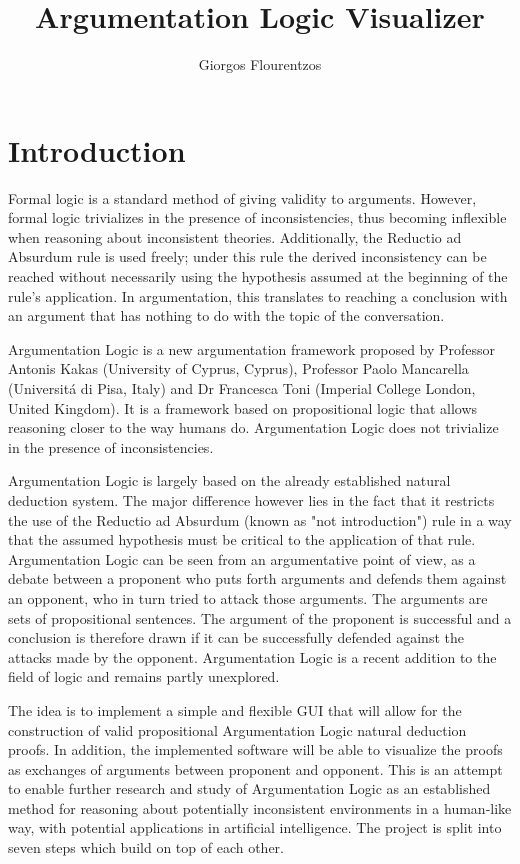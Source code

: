\documentclass[11pt,twoside,a4paper]{report}
\author{Giorgos Flourentzos}
\title{Argumentation Logic Visualizer}
\begin{document}
\maketitle
\tableofcontents

\chapter{Introduction}

Formal logic is a standard method of giving validity to arguments. However, formal logic trivializes in the presence of inconsistencies, thus becoming inflexible when reasoning about inconsistent theories. Additionally, the Reductio ad Absurdum rule is used freely; under this rule the derived inconsistency can be reached without necessarily using the hypothesis assumed at the beginning of the rule's application. In argumentation, this translates to reaching a conclusion with an argument that has nothing to do with the topic of the conversation.

Argumentation Logic is a new argumentation framework proposed by Professor Antonis Kakas (University of Cyprus, Cyprus), Professor Paolo Mancarella (Universit\'a di Pisa, Italy) and Dr Francesca Toni (Imperial College London, United Kingdom). It is a framework based on propositional logic that allows reasoning closer to the way humans do. Argumentation Logic does not trivialize in the presence of inconsistencies.

Argumentation Logic is largely based on the already established natural deduction system. The major difference however lies in the fact that it restricts the use of the Reductio ad Absurdum (known as "not introduction") rule in a way that the assumed hypothesis must be critical to the application of that rule. Argumentation Logic can be seen from an argumentative point of view, as a debate between a proponent who puts forth arguments and defends them against an opponent, who in turn tried to attack those arguments. The arguments are sets of propositional sentences. The argument of the proponent is successful and a conclusion is therefore drawn if it can be successfully defended against the attacks made by the opponent. Argumentation Logic is a recent addition to the field of logic and remains partly unexplored.

The idea is to implement a simple and flexible GUI that will allow for the construction of valid propositional Argumentation Logic natural deduction proofs. In addition, the implemented software will be able to visualize the proofs as exchanges of arguments between proponent and opponent. This is an attempt to enable further research and study of Argumentation Logic as an established method for reasoning about potentially inconsistent environments in a human-like way, with potential applications in artificial intelligence.
The project is split into seven steps which build on top of each other.
\end{document}
